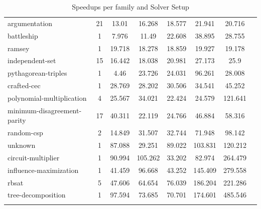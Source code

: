 \documentclass[12pt,a4paper,twoside]{scrartcl}
\numberwithin{equation}{section}
\begin{document}
\begin{longtable}{ lccccccc }
  argumentation	&	21	&	13.01	&	16.268	&	18.577	&	21.941	&	20.716	\\
  battleship	&	1	&	7.976	&	11.49	&	22.608	&	38.895	&	28.755	\\
  ramsey	&	1	&	19.718	&	18.278	&	18.859	&	19.927	&	19.178	\\
  independent-set	&	15	&	16.442	&	18.038	&	20.981	&	27.173	&	25.9	\\
  pythagorean-triples	&	1	&	4.46	&	23.726	&	24.031	&	96.261	&	28.008	\\
  crafted-cec	&	1	&	28.769	&	28.202	&	30.506	&	34.541	&	45.252	\\
  polynomial-multiplication	&	4	&	25.567	&	34.021	&	22.424	&	24.579	&	121.641	\\
  minimum-disagreement-parity	&	17	&	40.311	&	22.119	&	24.766	&	46.884	&	58.316	\\
  random-csp	&	2	&	14.849	&	31.507	&	32.744	&	71.948	&	98.142	\\
  unknown	&	1	&	87.088	&	29.251	&	89.022	&	103.831	&	120.212	\\
  circuit-multiplier	&	1	&	90.994	&	105.262	&	33.202	&	82.974	&	264.479	\\
  influence-maximization	&	1	&	41.459	&	96.668	&	43.252	&	145.409	&	279.558	\\
  rbsat	&	5	&	47.606	&	64.654	&	76.039	&	186.204	&	221.286	\\
  tree-decomposition	&	1	&	97.594	&	73.685	&	70.701	&	174.601	&	485.546	\\
  \bottomrule
  \caption{Speedups per family and Solver Setup}
  \label{tab:speedupsFamiliesComplete}
\end{longtable}



\end{document}
